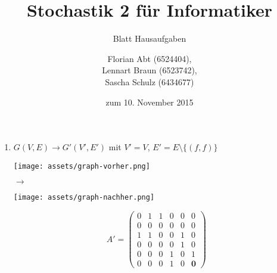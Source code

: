 \documentclass[a4paper]{scrartcl}
\title{Stochastik 2 für Informatiker}
\subtitle{Blatt {\blattnr} Hausaufgaben}
\author{
    Florian Abt (6524404), \\
    Lennart Braun (6523742), \\
    Sascha Schulz (6434677)
}
\date{zum 10. November 2015}
\def \blattnr {4}
\begin{document}
\maketitle

\begin{enumerate}[label=\bfseries \blattnr.\arabic*]
    \item
    $G(V,E) \to G'(V', E')$ mit $V' = V$, $E' = E\setminus\{(f,f)\}$

    \begin{minipage}{0.25\textwidth}
    \centering
    \texttt{[image: assets/graph-vorher.png]}     
    \end{minipage}
    \begin{minipage}{0.01\textwidth}
    \centering
    $\to$     
    \end{minipage}
    \begin{minipage}{0.24\textwidth}
     \centering
     \texttt{[image: assets/graph-nachher.png]}
    \end{minipage}
    \begin{minipage}{0.5\textwidth}
     \begin{equation*}
	A' = \begin{pmatrix}
	     0 & 1 & 1 & 0 & 0 & 0 \\
	     0 & 0 & 0 & 0 & 0 & 0 \\
	     1 & 1 & 0 & 0 & 1 & 0 \\
	     0 & 0 & 0 & 0 & 1 & 0 \\
	     0 & 0 & 0 & 1 & 0 & 1 \\
	     0 & 0 & 0 & 1 & 0 & \textbf{0}
	    \end{pmatrix}
     \end{equation*}
    \end{minipage}
    

\end{enumerate}
\end{document}

